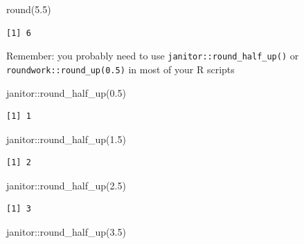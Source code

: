 \documentclass[
  letterpaper,
  DIV=11,
  numbers=noendperiod]{scrreprt}
\newenvironment{Shaded}{\begin{snugshade}}{\end{snugshade}}
\newcommand{\FloatTok}[1]{\textcolor[rgb]{0.68,0.00,0.00}{#1}}
\newcommand{\FunctionTok}[1]{\textcolor[rgb]{0.28,0.35,0.67}{#1}}
\newcommand{\NormalTok}[1]{\textcolor[rgb]{0.00,0.23,0.31}{#1}}
\newcommand{\SpecialCharTok}[1]{\textcolor[rgb]{0.37,0.37,0.37}{#1}}
\begin{document}
\begin{Shaded}
\begin{Highlighting}[]
\FunctionTok{round}\NormalTok{(}\FloatTok{5.5}\NormalTok{)}
\end{Highlighting}
\end{Shaded}

\begin{verbatim}
[1] 6
\end{verbatim}

Remember: you probably need to use \texttt{janitor::round\_half\_up()}
or \texttt{roundwork::round\_up(0.5)} in most of your R scripts

\begin{Shaded}
\begin{Highlighting}[]
\NormalTok{janitor}\SpecialCharTok{::}\FunctionTok{round\_half\_up}\NormalTok{(}\FloatTok{0.5}\NormalTok{)}
\end{Highlighting}
\end{Shaded}

\begin{verbatim}
[1] 1
\end{verbatim}

\begin{Shaded}
\begin{Highlighting}[]
\NormalTok{janitor}\SpecialCharTok{::}\FunctionTok{round\_half\_up}\NormalTok{(}\FloatTok{1.5}\NormalTok{)}
\end{Highlighting}
\end{Shaded}

\begin{verbatim}
[1] 2
\end{verbatim}

\begin{Shaded}
\begin{Highlighting}[]
\NormalTok{janitor}\SpecialCharTok{::}\FunctionTok{round\_half\_up}\NormalTok{(}\FloatTok{2.5}\NormalTok{)}
\end{Highlighting}
\end{Shaded}

\begin{verbatim}
[1] 3
\end{verbatim}

\begin{Shaded}
\begin{Highlighting}[]
\NormalTok{janitor}\SpecialCharTok{::}\FunctionTok{round\_half\_up}\NormalTok{(}\FloatTok{3.5}\NormalTok{)}
\end{Highlighting}
\end{Shaded}
\end{document}
